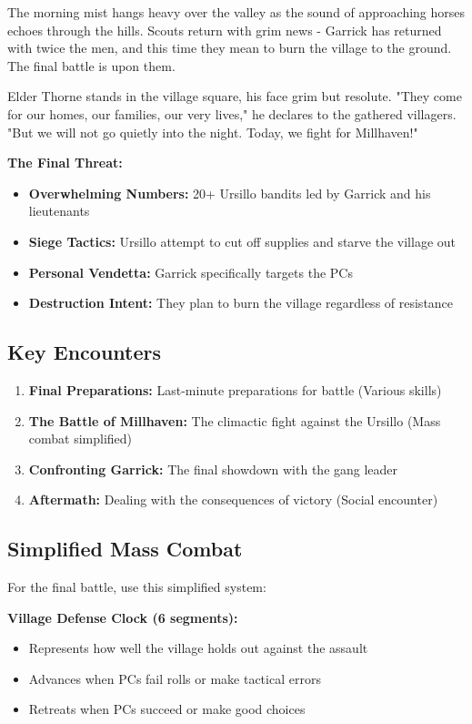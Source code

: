 \documentclass[11pt]{article}
\begin{document}
The morning mist hangs heavy over the valley as the sound of approaching horses echoes through the hills. Scouts return with grim news - Garrick has returned with twice the men, and this time they mean to burn the village to the ground. The final battle is upon them.

Elder Thorne stands in the village square, his face grim but resolute. "They come for our homes, our families, our very lives," he declares to the gathered villagers. "But we will not go quietly into the night. Today, we fight for Millhaven!"

\textbf{The Final Threat:}
\begin{itemize}
\item \textbf{Overwhelming Numbers:} 20+ Ursillo bandits led by Garrick and his lieutenants
\item \textbf{Siege Tactics:} Ursillo attempt to cut off supplies and starve the village out
\item \textbf{Personal Vendetta:} Garrick specifically targets the PCs
\item \textbf{Destruction Intent:} They plan to burn the village regardless of resistance
\end{itemize}

\subsection{Key Encounters}

\begin{enumerate}
\item \textbf{Final Preparations:} Last-minute preparations for battle (Various skills)
\item \textbf{The Battle of Millhaven:} The climactic fight against the Ursillo (Mass combat simplified)
\item \textbf{Confronting Garrick:} The final showdown with the gang leader
\item \textbf{Aftermath:} Dealing with the consequences of victory (Social encounter)
\end{enumerate}

\subsection{Simplified Mass Combat}

For the final battle, use this simplified system:

\textbf{Village Defense Clock (6 segments):}
\begin{itemize}
\item Represents how well the village holds out against the assault
\item Advances when PCs fail rolls or make tactical errors
\item Retreats when PCs succeed or make good choices
\end{itemize}
\end{document}
